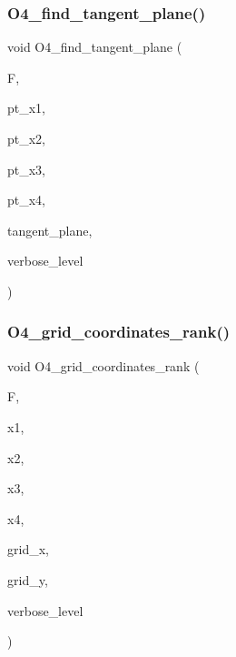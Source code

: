 \subsubsection{\texorpdfstring{O4\+\_\+find\+\_\+tangent\+\_\+plane()}{O4\_find\_tangent\_plane()}}
{\footnotesize\ttfamily void O4\+\_\+find\+\_\+tangent\+\_\+plane (\begin{DoxyParamCaption}\item[{\mbox{\hyperlink{classfinite__field}{finite\+\_\+field}} \&}]{F,  }\item[{\mbox{\hyperlink{galois_8h_a09fddde158a3a20bd2dcadb609de11dc}{I\+NT}}}]{pt\+\_\+x1,  }\item[{\mbox{\hyperlink{galois_8h_a09fddde158a3a20bd2dcadb609de11dc}{I\+NT}}}]{pt\+\_\+x2,  }\item[{\mbox{\hyperlink{galois_8h_a09fddde158a3a20bd2dcadb609de11dc}{I\+NT}}}]{pt\+\_\+x3,  }\item[{\mbox{\hyperlink{galois_8h_a09fddde158a3a20bd2dcadb609de11dc}{I\+NT}}}]{pt\+\_\+x4,  }\item[{\mbox{\hyperlink{galois_8h_a09fddde158a3a20bd2dcadb609de11dc}{I\+NT}} $\ast$}]{tangent\+\_\+plane,  }\item[{\mbox{\hyperlink{galois_8h_a09fddde158a3a20bd2dcadb609de11dc}{I\+NT}}}]{verbose\+\_\+level }\end{DoxyParamCaption})}

\mbox{\label{group__generators_8_c_a26261eb7d9fbe56530e1d7805f51869c}} 
\subsubsection{\texorpdfstring{O4\+\_\+grid\+\_\+coordinates\+\_\+rank()}{O4\_grid\_coordinates\_rank()}}
{\footnotesize\ttfamily void O4\+\_\+grid\+\_\+coordinates\+\_\+rank (\begin{DoxyParamCaption}\item[{\mbox{\hyperlink{classfinite__field}{finite\+\_\+field}} \&}]{F,  }\item[{\mbox{\hyperlink{galois_8h_a09fddde158a3a20bd2dcadb609de11dc}{I\+NT}}}]{x1,  }\item[{\mbox{\hyperlink{galois_8h_a09fddde158a3a20bd2dcadb609de11dc}{I\+NT}}}]{x2,  }\item[{\mbox{\hyperlink{galois_8h_a09fddde158a3a20bd2dcadb609de11dc}{I\+NT}}}]{x3,  }\item[{\mbox{\hyperlink{galois_8h_a09fddde158a3a20bd2dcadb609de11dc}{I\+NT}}}]{x4,  }\item[{\mbox{\hyperlink{galois_8h_a09fddde158a3a20bd2dcadb609de11dc}{I\+NT}} \&}]{grid\+\_\+x,  }\item[{\mbox{\hyperlink{galois_8h_a09fddde158a3a20bd2dcadb609de11dc}{I\+NT}} \&}]{grid\+\_\+y,  }\item[{\mbox{\hyperlink{galois_8h_a09fddde158a3a20bd2dcadb609de11dc}{I\+NT}}}]{verbose\+\_\+level }\end{DoxyParamCaption})}

